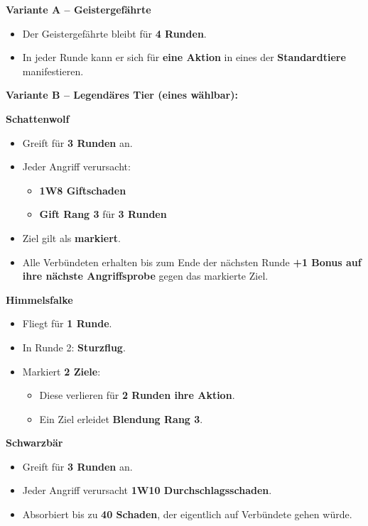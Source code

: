 {
	\textbf{Variante A – Geistergefährte}
	\begin{itemize}
		\item Der Geistergefährte bleibt für \textbf{4 Runden}.
		\item In jeder Runde kann er sich für \textbf{eine Aktion}
		in eines der \textbf{Standardtiere} manifestieren.
	\end{itemize}
	
	\medskip
	\textbf{Variante B – Legendäres Tier (eines wählbar):}
	
	\medskip
	\textbf{Schattenwolf}
	\begin{itemize}
		\item Greift für \textbf{3 Runden} an.
		\item Jeder Angriff verursacht:
		\begin{itemize}
			\item \textbf{1W8 Giftschaden}
			\item \textbf{Gift Rang 3} für \textbf{3 Runden}
		\end{itemize}
		\item Ziel gilt als \textbf{markiert}.
		\item Alle Verbündeten erhalten bis zum Ende der nächsten Runde
		\textbf{+1 Bonus auf ihre nächste Angriffsprobe}
		gegen das markierte Ziel.
	\end{itemize}
	
	\medskip
	\textbf{Himmelsfalke}
	\begin{itemize}
		\item Fliegt für \textbf{1 Runde}.
		\item In Runde 2: \textbf{Sturzflug}.
		\item Markiert \textbf{2 Ziele}:
		\begin{itemize}
			\item Diese verlieren für \textbf{2 Runden ihre Aktion}.
			\item Ein Ziel erleidet \textbf{Blendung Rang 3}.
		\end{itemize}
	\end{itemize}
	
	\medskip
	\textbf{Schwarzbär}
	\begin{itemize}
		\item Greift für \textbf{3 Runden} an.
		\item Jeder Angriff verursacht \textbf{1W10 Durchschlagsschaden}.
		\item Absorbiert bis zu \textbf{40 Schaden},
		der eigentlich auf Verbündete gehen würde.
	\end{itemize}
}


